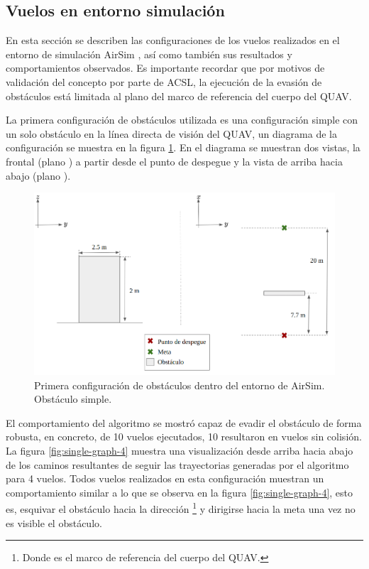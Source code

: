 \label{sec:results-flights}

\subsection{Vuelos en entorno simulación}

\label{sec:results-AirSim}

En esta sección se describen las configuraciones de los vuelos realizados en el entorno de simulación AirSim \cite{shah2018airsim}, así como también sus resultados y comportamientos observados. Es importante recordar que por motivos de validación del concepto por parte de ACSL, la ejecución de la evasión de obstáculos está limitada al plano  del marco de referencia del cuerpo del QUAV.

La primera configuración de obstáculos utilizada es una configuración simple con un solo obstáculo en la línea directa de visión del QUAV, un diagrama de la configuración se muestra en la figura \ref{fig:config-1-single}. En el diagrama se muestran dos vistas, la frontal (plano ) a partir desde el punto de despegue y la vista de arriba hacia abajo (plano ).

\begin{figure}[H]
    \centering
    \includegraphics[scale=0.35]{partes/img/config-1-single.png}
    \caption[Primera configuración de obstáculos dentro del entorno de AirSim.]{Primera configuración de obstáculos dentro del entorno de AirSim. Obstáculo simple.}
    \label{fig:config-1-single}
\end{figure}

El comportamiento del algoritmo se mostró capaz de evadir el obstáculo de forma robusta, en concreto, de 10 vuelos ejecutados, 10 resultaron en vuelos sin colisión. La figura \ref{fig:single-graph-4} muestra una visualización desde arriba hacia abajo de los caminos resultantes de seguir las trayectorias generadas por el algoritmo para 4 vuelos. Todos vuelos realizados en esta configuración muestran un comportamiento similar a lo que se observa en la figura \ref{fig:single-graph-4}, esto es, esquivar el obstáculo hacia la dirección \footnote[1]{Donde  es el marco de referencia del cuerpo del QUAV.} y dirigirse hacia la meta una vez no es visible el obstáculo.

